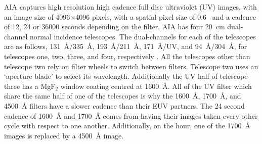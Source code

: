 AIA captures high resolution high cadence full disc ultraviolet (UV) images, with an image size of 4096$\times$4096 pixels, with a spatial pixel size of 0.6~\arcsec{} and a cadence of 12, 24 or 36000 seconds depending on the filter.
AIA has four 20~cm dual-channel normal incidence telescopes. The dual-channels for each of the telescopes are as follows, 131~\AA/335~\AA, 193~\AA/211~\AA, 171~\AA/UV, and 94~\AA/304~\AA, for telescopes one, two, three, and four, respectively \citep{lemen_atmospheric_2012}. All the telescopes other than telescope two rely on filter wheels to switch between filters. Telescope two uses an `aperture blade' to select its wavelength. Additionally the UV half of telescope three has a MgF$_2$ window coating centred at 1600~\AA. All of the UV filter which share the same half of one of the telescopes is why the 1600~\AA, 1700~\AA, and 4500~\AA{} filters have a slower cadence than their EUV partners. The 24 second cadence of 1600~\AA{} and 1700~\AA{} comes from having their images taken every other cycle with respect to one another. Additionally, on the hour, one of the 1700~\AA{} images is replaced by a 4500~\AA{} image.
